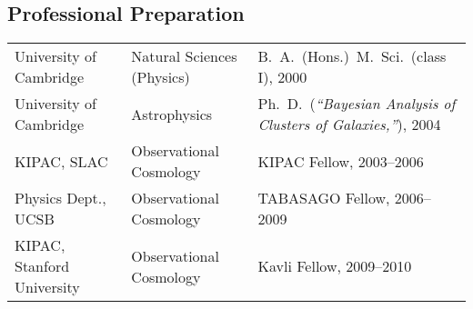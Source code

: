\subsection*{Professional Preparation}

\begin{tabular}{@{}p{4.8cm}p{2.8cm}p{10.5cm}}
University of Cambridge    &  Natural Sciences (Physics) & B.\ A.\ (Hons.)\, M.\ Sci.\ (class I), 2000 \\
University of Cambridge    &  Astrophysics               & Ph.\ D.\ (\textit{``Bayesian Analysis of Clusters of Galaxies,''}), 2004 \\
KIPAC, SLAC                &  Observational Cosmology    & KIPAC Fellow, 2003--2006 \\
Physics Dept., UCSB        &  Observational Cosmology    & TABASAGO Fellow, 2006--2009 \\
KIPAC, Stanford University &  Observational Cosmology    & Kavli Fellow, 2009--2010
\end{tabular}
